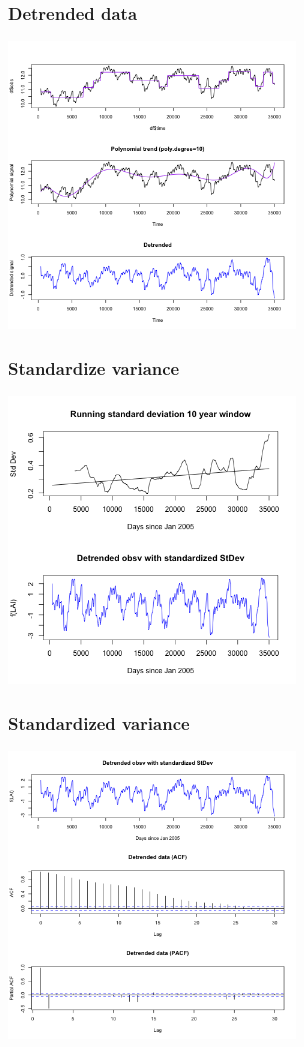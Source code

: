 \documentclass{beamer}
\begin{document}
\begin{frame}
    \frametitle{Detrended data}
    \includegraphics[height=3in]{../img/detrended_acf_pacf.png}
\end{frame}

\begin{frame}
    \frametitle{Standardize variance}
    \includegraphics[height=3in]{../img/standatdized_var_LAI.png}
\end{frame}

\begin{frame}
    \frametitle{Standardized variance}
    \includegraphics[height=3in]{../img/detrended_stdzd_acf_pacf.png}
\end{frame}
\end{document}
